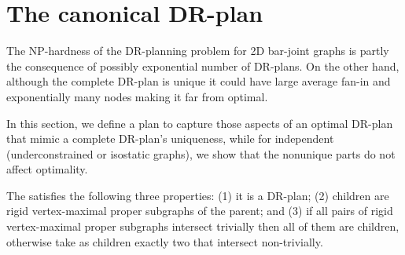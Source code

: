 \section{The canonical DR-plan}
\label{sec:DRP}


The NP-hardness of the DR-planning problem for 2D bar-joint graphs is partly the consequence of possibly exponential number of DR-plans. On the other hand, although the complete DR-plan is unique it could have large average fan-in and exponentially many nodes making it far from optimal.

In this section, we define a  plan to capture those aspects of an optimal DR-plan that mimic a complete DR-plan's uniqueness, while for independent (underconstrained or isostatic graphs), we show that the nonunique parts do not affect optimality.


\begin{definition}\label{def:canonical_drplan}
    The  satisfies the following three properties:
    (1) it is a DR-plan;
    (2) children are rigid vertex-maximal proper subgraphs of the parent; and
    (3) if all pairs of rigid vertex-maximal proper subgraphs intersect trivially then all of them are children, otherwise take as children exactly two that intersect non-trivially.
\end{definition}


